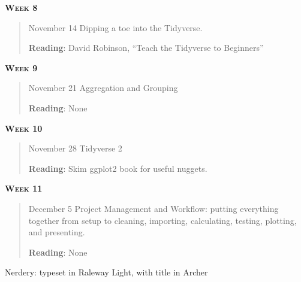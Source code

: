 \documentclass[11pt,letterpaper]{article}
\begin{document}
\textbf{\textsc{Week 8}}
		\begin{quote}	
		November 14  \textbullet \space Dipping a toe into the Tidyverse. 
		
		\textbf{Reading}: David Robinson, ``Teach the Tidyverse to Beginners''
		\end{quote}

\textbf{\textsc{Week 9}}
		\begin{quote}	
		November 21  \textbullet \space Aggregation and Grouping 
		
		\textbf{Reading}: None
		\end{quote}

\textbf{\textsc{Week 10}}
		\begin{quote}	
		November 28 \textbullet \space Tidyverse 2
		
		\textbf{Reading}:  Skim ggplot2 book for useful nuggets.
		\end{quote}

\textbf{\textsc{Week 11}}
		\begin{quote}	
		December  5 \textbullet \space Project Management and Workflow: putting everything together from setup to cleaning, importing, calculating, testing, plotting, and presenting. 
		
		\textbf{Reading}:  None 
		\end{quote}



\vfill
{\tiny Nerdery: typeset in Raleway Light, with title in Archer}
\end{document}
